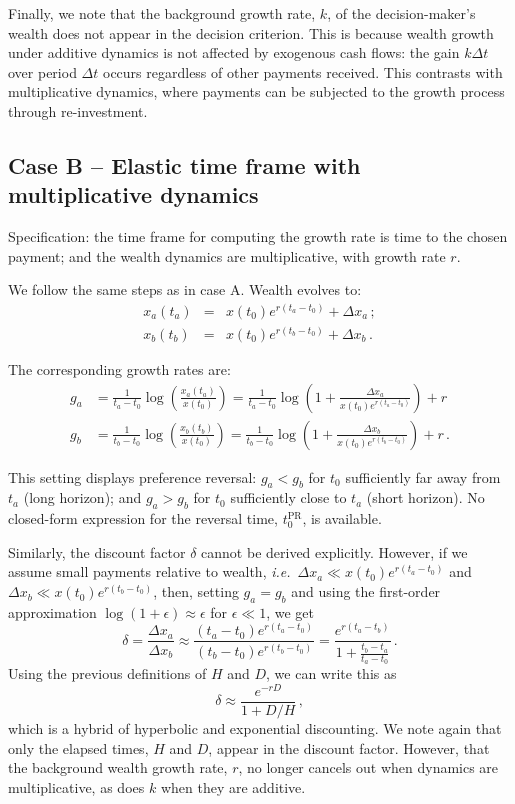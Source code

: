 \documentclass[11pt]{article}
\newcommand{\ie}{{\it i.e.}\ }
\newcommand{\be}{\begin{equation}}
\newcommand{\ee}{\end{equation}}
\newcommand{\bea}{\begin{eqnarray}}
\newcommand{\eea}{\end{eqnarray}}
\newcommand{\Dt}{\Delta t}
\newcommand{\Dx}{\Delta x}
\newcommand{\del}{D}
\newcommand{\hor}{H}
\numberwithin{equation}{section}
\begin{document}
Finally, we note that the background growth rate, $k$, of the decision-maker's wealth does not appear in the decision criterion. This is because wealth growth under additive dynamics is not affected by exogenous cash flows: the gain $k\Dt$ over period $\Dt$ occurs regardless of other payments received. This contrasts with multiplicative dynamics, where payments can be subjected to the growth process through re-investment.

\subsection{Case B -- Elastic time frame with multiplicative dynamics}\label{sec:case_B}

Specification: the time frame for computing the growth rate is time to the chosen payment; and the wealth dynamics are multiplicative, with growth rate $r$.

We follow the same steps as in case A. Wealth evolves to:
\bea
x_a\left(t_a\right) &=& x\left(t_0\right) e^{r(t_a-t_0)} + \Dx_a\,;\\
x_b\left(t_b\right) &=& x\left(t_0\right) e^{r(t_b-t_0)} + \Dx_b\,.
\eea

The corresponding growth rates are:
\bea
g_a &= \frac{1}{t_a-t_0} \log{\left(\frac{x_a\left(t_a\right)}{x\left(t_0\right)}\right)} = \frac{1}{t_a-t_0}\log{\left(1 + \frac{\Dx_a}{x\left(t_0\right)e^{r(t_a-t_0)}}\right)} + r\\
g_b &= \frac{1}{t_b-t_0} \log{\left(\frac{x_b\left(t_b\right)}{x\left(t_0\right)}\right)} = \frac{1}{t_b-t_0}\log{\left(1 + \frac{\Dx_b}{x\left(t_0\right)e^{r(t_b-t_0)}}\right)} + r\,.
\eea

This setting displays preference reversal: $g_a<g_b$ for $t_0$ sufficiently far away from $t_a$ (long horizon); and $g_a>g_b$ for $t_0$ sufficiently close to $t_a$ (short horizon). No closed-form expression for the reversal time, $t_0^\text{PR}$, is available.

Similarly, the discount factor $\delta$ cannot be derived explicitly. However, if we assume small payments relative to wealth, \ie $\Dx_a \ll x\left(t_0\right)e^{r(t_a-t_0)}$ and $\Dx_b \ll x\left(t_0\right)e^{r(t_b-t_0)}$, then, setting $g_a=g_b$ and using the first-order approximation $\log(1+\epsilon)\approx\epsilon$ for $\epsilon\ll1$, we get
\be
\delta = \frac{\Dx_a}{\Dx_b} \approx \frac{(t_a-t_0)e^{r(t_a-t_0)}}{(t_b-t_0)e^{r(t_b-t_0)}} =
\frac{e^{r(t_a-t_b)}}{1+\frac{t_b-t_a}{t_a-t_0}}\,.
\ee
Using the previous definitions of $\hor$ and $\del$, we can write this as
\be
\delta \approx \frac{e^{-r\del}}{1+\del/\hor}\,,
\ee
which is a hybrid of hyperbolic and exponential discounting. We note again that only the elapsed times, $\hor$ and $\del$, appear in the discount factor. However, that the background wealth growth rate, $r$, no longer cancels out when dynamics are multiplicative, as does $k$ when they are additive.
\end{document}
